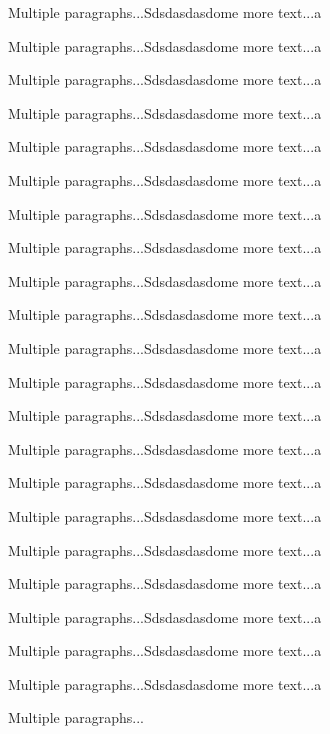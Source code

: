 \documentclass[doublespace,endnotes]{lingpaper}
\begin{document}
Multiple paragraphs...Sdsdasdasdome more text...a

Multiple paragraphs...Sdsdasdasdome more text...a

Multiple paragraphs...Sdsdasdasdome more text...a

Multiple paragraphs...Sdsdasdasdome more text...a

Multiple paragraphs...Sdsdasdasdome more text...a

Multiple paragraphs...Sdsdasdasdome more text...a

Multiple paragraphs...Sdsdasdasdome more text...a

Multiple paragraphs...Sdsdasdasdome more text...a

Multiple paragraphs...Sdsdasdasdome more text...a

Multiple paragraphs...Sdsdasdasdome more text...a

Multiple paragraphs...Sdsdasdasdome more text...a

Multiple paragraphs...Sdsdasdasdome more text...a

Multiple paragraphs...Sdsdasdasdome more text...a

Multiple paragraphs...Sdsdasdasdome more text...a

Multiple paragraphs...Sdsdasdasdome more text...a

Multiple paragraphs...Sdsdasdasdome more text...a

Multiple paragraphs...Sdsdasdasdome more text...a

Multiple paragraphs...Sdsdasdasdome more text...a

Multiple paragraphs...Sdsdasdasdome more text...a

Multiple paragraphs...Sdsdasdasdome more text...a

Multiple paragraphs...Sdsdasdasdome more text...a

Multiple paragraphs...

\theendnotes
\end{document}
